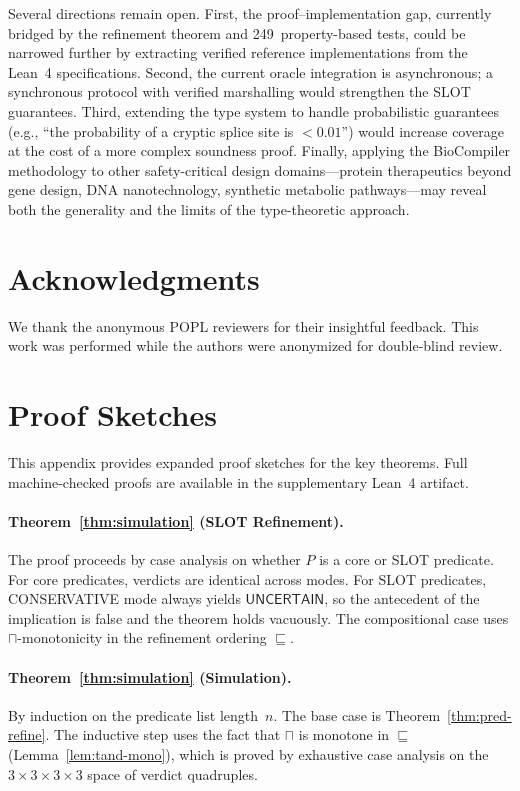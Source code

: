 \documentclass[acmsmall,review,anonymous]{acmart}
\newcommand{\UNCERTAIN}{\ensuremath{\mathsf{UNCERTAIN}}\xspace}
\newcommand{\tand}{\sqcap}
\newcommand{\pred}{P}
\begin{document}
Several directions remain open.
First, the proof--implementation gap, currently bridged by the
refinement theorem and 249~property-based tests, could be narrowed
further by extracting verified reference implementations from the
Lean~4 specifications.
Second, the current oracle integration is asynchronous; a synchronous
protocol with verified marshalling would strengthen the SLOT guarantees.
Third, extending the type system to handle probabilistic guarantees
(e.g., ``the probability of a cryptic splice site is $< 0.01$'') would
increase coverage at the cost of a more complex soundness proof.
Finally, applying the BioCompiler methodology to other
safety-critical design domains---protein therapeutics beyond gene
design, DNA nanotechnology, synthetic metabolic pathways---may reveal
both the generality and the limits of the type-theoretic approach.

\section*{Acknowledgments}

We thank the anonymous POPL reviewers for their insightful feedback.
This work was performed while the authors were anonymized for
double-blind review.

\appendix
\section{Proof Sketches}\label{app:proofs}

This appendix provides expanded proof sketches for the key theorems.
Full machine-checked proofs are available in the supplementary
Lean~4 artifact.

\paragraph{Theorem~\ref{thm:simulation} (SLOT Refinement).}
The proof proceeds by case analysis on whether $\pred$ is a core or
SLOT predicate.
For core predicates, verdicts are identical across modes.
For SLOT predicates, CONSERVATIVE mode always yields \UNCERTAIN, so
the antecedent of the implication is false and the theorem holds
vacuously.
The compositional case uses $\tand$-monotonicity in the refinement
ordering $\sqsubseteq$.

\paragraph{Theorem~\ref{thm:simulation} (Simulation).}
By induction on the predicate list length~$n$.
The base case is Theorem~\ref{thm:pred-refine}.
The inductive step uses the fact that $\tand$ is monotone in
$\sqsubseteq$ (Lemma~\ref{lem:tand-mono}), which is proved by
exhaustive case analysis on the $3 \times 3 \times 3 \times 3$ space
of verdict quadruples.
\end{document}
